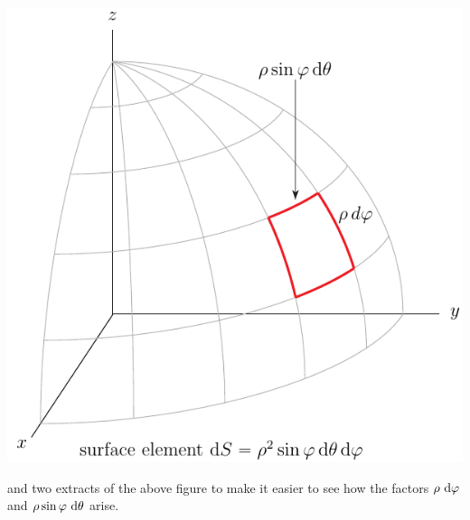 \begin{efig}
\begin{center}
    \includegraphics{spher11.pdf}
\end{center}
\end{efig}
and two extracts of the above figure to make it easier to see 
how the factors $\rho\ \mathrm{d}\varphi$ and 
$\rho\sin\varphi\ \mathrm{d}\theta$ arise.
